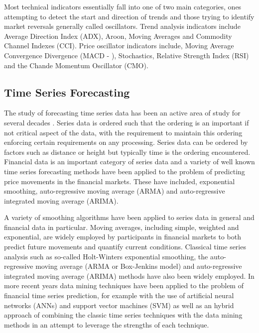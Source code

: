 Most technical indicators essentially fall into one of two main categories, ones attempting to detect the start and direction of trends and those trying to identify market reversals generally called oscillators. Trend analysis indicators include Average Direction Index (ADX), Aroon, Moving Averages and Commodity Channel Indexes (CCI). Price oscillator indicators include, Moving Average Convergence Divergence (MACD - \citep{appel2007understanding}), Stochastics, Relative Strength Index (RSI) and the Chande Momentum Oscillator (CMO).

\subsection{Time Series Forecasting}
The study of forecasting time series data has been an active area of study for several decades \citep{DeGooijer2006443}. Series data is ordered such that the ordering is an important if not critical aspect of the data, with the requirement to maintain this ordering enforcing certain requirements on any processing. Series data can be ordered by factors such as distance or height but typically time is the ordering encountered. Financial data is an important category of series data and a variety of well known time series forecasting methods have been applied to the problem of predicting price movements in the financial markets. These have included, exponential smoothing, auto-regressive moving average (ARMA)
and auto-regressive integrated moving average (ARIMA).

A variety of smoothing algorithms have been applied to series data in general and financial data in particular. Moving averages, including simple, weighted and exponential, are widely employed by participants in financial markets to both predict future movements and quantify current conditions. Classical time series analysis such as so-called Holt-Winters exponential smoothing, the auto-regressive moving average (ARMA or Box-Jenkins model) and auto-regressive integrated moving average (ARIMA) methods have also been widely employed. In more recent years data mining techniques have been applied to the problem of financial time series prediction, for example with the use of artificial neural networks (ANNs) and support vector machines (SVM) as well as an hybrid approach of combining the classic time series techniques with the data mining methods in an attempt to leverage the strengths of each technique.


